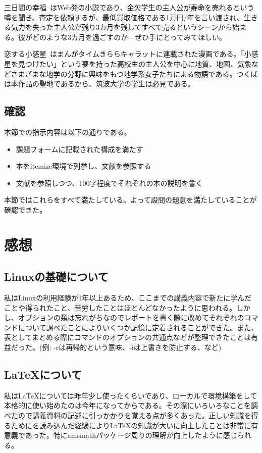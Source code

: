 \documentclass[dvipdfmx,12pt,a4j]{jarticle}
\begin{document}
三日間の幸福~\cite{koufuku}はWeb発の小説であり、金欠学生の主人公が寿命を売れるという噂を聞き、査定を依頼するが、最低買取価格である1万円/年を言い渡され、生きる気力を失った主人公が残り3カ月を残してすべて売るというシーンから始まる。彼がどのような3カ月を過ごすのか—ぜひ手にとってみてほしい。

恋する小惑星~\cite{koiasu}はまんがタイムきららキャラットに連載された漫画である。「小惑星を見つけたい」という夢を持った高校生の主人公を中心に地質、地図、気象などさまざまな地学の分野に興味をもつ地学系女子たちによる物語である。つくばは本作品の聖地であるから、筑波大学の学生は必見である。
\subsection{確認}
本節での指示内容は以下の通りである。
\begin{itemize}
  \item 課題フォームに記載された構成を満たす
  \item 本をitemize環境で列挙し、文献を参照する
  \item 文献を参照しつつ、100字程度でそれぞれの本の説明を書く
\end{itemize}
本節ではこれらをすべて満たしている。よって設問の題意を満たしていることが確認できた。

\section{感想}
\subsection{Linuxの基礎について}
私はLinuxの利用経験が1年以上あるため、ここまでの講義内容で新たに学んだことや得られたこと、苦労したことはほとんどなかったように思われる。しかし、オプションの類は忘れがちなのでレポートを書く際に改めてそれぞれのコマンドについて調べたことによりいくつか記憶に定着されることができた。また、表としてまとめる際にコマンドのオプションの共通点などが整理できたことは有益だった。(例: -rは再帰的という意味、-iは上書きを防止する、など)

\subsection{\LaTeX について}
私は\LaTeX については昨年少し使ったくらいであり、ローカルで環境構築をして本格的に使い始めたのは今年になってからである。その際にいろいろなことを調べたので講義資料の記述に引っかかりを覚える点が多くあった。正しい知識を得るために\cite{bibunsho}を読み込んだ経験により\LaTeX の知識が大いに向上したことは非常に有意義であった。特にamsmathパッケージ周りの理解が向上したように感じられる。
\end{document}
